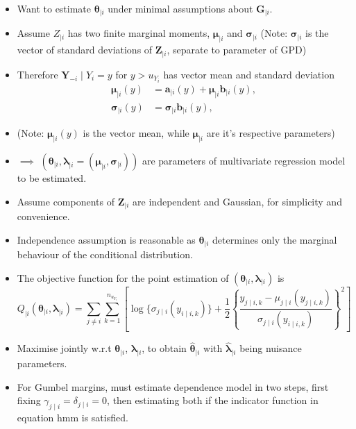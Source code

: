 \documentclass{article}
\begin{document}
\begin{itemize}
  \item Want to estimate $\bm{\theta}_{\mid i}$ under minimal assumptions about $\bm{G}_{\mid i}$. 
  \item Assume $Z_{\mid i}$ has two finite marginal moments, $\bm{\mu}_{\mid i}$ and $\bm{\sigma}_{\mid i}$ (Note: $\bm{\sigma}_{\mid i}$ is the vector of standard deviations of $\bm{Z}_{\mid i}$, separate to parameter of GPD) 
  \item Therefore $\bm{Y}_{-i} \mid Y_i = y$ for $y > u_{Y_i}$ has vector mean and standard deviation
    \begin{align*}
      \bm{\mu}_{\mid i}(y) &= \bm{a}_{\mid i}(y) + \bm{\mu}_{\mid i}{\bm{b}_{\mid i}}(y), \\
      \bm{\sigma}_{\mid i}(y) &= \bm{\sigma}_{\mid i}{\bm{b}_{\mid i}}(y),
    \end{align*}
  \item (Note: $\bm{\mu}_{\mid i}(y)$ is the vector mean, while $\bm{\mu}_{\mid i}$ are it's respective parameters)
  \item $\implies$ $(\bm{\theta}_{\mid i}, \bm{\lambda}_{\mid i} = (\bm{\mu}_{\mid i}, \bm{\sigma}_{\mid i}))$ are parameters of multivariate regression model to be estimated. 
  \item Assume components of $\bm{Z}_{\mid i}$ are independent and Gaussian, for simplicity and convenience. 
  \item Independence assumption is reasonable as $\bm{\theta}_{\mid i}$ determines only the marginal behaviour of the conditional distribution. 
  \item The objective function for the point estimation of $(\bm{\theta}_{\mid i}, \bm{\lambda}_{\mid i})$ is 
    \[
      Q_{\mid i}(\bm{\theta}_{\mid i}, \bm{\lambda}_{\mid i}) = \sum_{j \ne i}\sum_{k=1}^{n_{u_{Y_i}}}{\left[\log\{\sigma_{j \mid i}(y_{i\mid i, k})\} + \frac{1}{2} \left\{ \frac{y_{j\mid i, k} - \mu_{j\mid i}(y_{j\mid i, k})}{\sigma_{j \mid i}(y_{i\mid i, k})} \right\}^2 \right]}
    \]
  \item Maximise jointly w.r.t $\bm{\theta}_{\mid i}$, $\bm{\lambda}_{\mid i}$, to obtain $\hat{\bm{\theta}}_{\mid i}$ with $\hat{\bm{\lambda}}_{\mid i} $ being nuisance parameters.
  \item For Gumbel margins, must estimate dependence model in two steps, first fixing $\gamma_{j \mid i} = \delta_{j \mid i} = 0$, then estimating both if the indicator function in equation hmm is satisfied.
\end{itemize}
\end{document}
